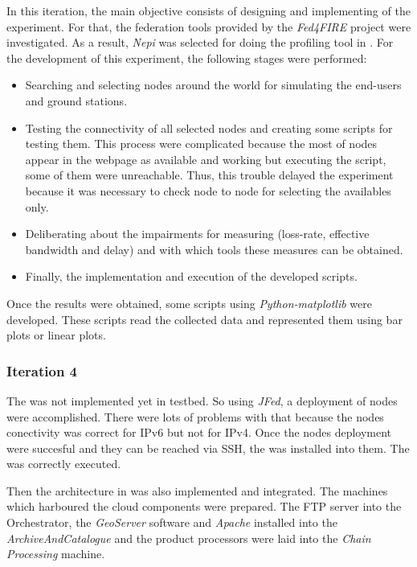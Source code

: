 In this iteration, the main objective consists of designing and implementing of the
\pl experiment. For that, the federation tools provided by the \emph{Fed4FIRE}
project were investigated. As a result, \emph{Nepi} was selected for doing the
profiling tool in \pl. 
For the development of this experiment, the following stages were performed:
\begin{itemize}
\item Searching and selecting nodes around the world for simulating the
  end-users and ground stations.
\item Testing the connectivity of all selected nodes and creating some scripts
  for testing them. This process were complicated because the most of nodes
  appear in the \pl webpage as available and working but executing the script,
  some of them were unreachable. Thus, this trouble delayed the experiment
  because it was necessary to check node to node for selecting the availables only.
\item Deliberating about the impairments for measuring (loss-rate, effective
  bandwidth and delay) and with which tools these measures can be obtained. 
\item Finally, the implementation and execution of the developed scripts.
\end{itemize}

Once the results were obtained, some scripts using \emph{Python-matplotlib} were
developed. These scripts read the collected data and represented them using bar
plots or linear plots. 

\subsubsection{Iteration 4}

The \sss was not implemented yet in \vw testbed. So using \emph{JFed}, a
deployment of \vw nodes were accomplished. There were lots of problems with that
because the nodes conectivity was correct for \ac{IP}v6 but not for
\ac{IP}v4. Once the nodes deployment were succesful and they can be reached via
\ac{SSH}, the \sss was installed into them. The \sss was correctly executed. 

Then the architecture in \bonfire was also implemented and integrated. The
machines which harboured the cloud components were prepared. The \ac{FTP} server
into the Orchestrator, the \emph{GeoServer} software and \emph{Apache} installed
into the \emph{ArchiveAndCatalogue} and the product processors were laid into
the \emph{Chain Processing} machine.

